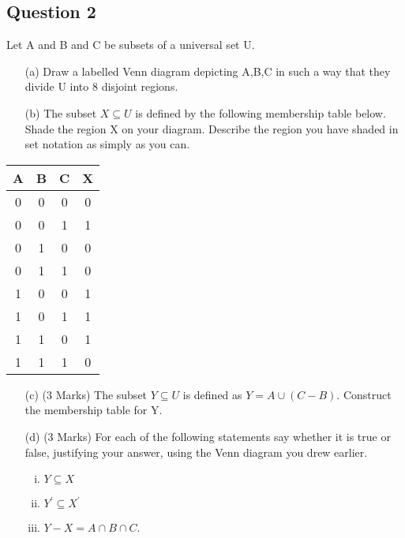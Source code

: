 \documentclass[11pt,a4paper,titlepage,oneside,openany]{article}
\numberwithin{equation}{section}
\numberwithin{algorithm}{section}
\numberwithin{figure}{section}
\numberwithin{table}{section}
\begin{document}
\newpage




\subsection*{Question 2}
Let A and B and C be subsets of a universal set U.
\begin{itemize}
\item[(a)] Draw a labelled Venn diagram depicting A,B,C in such a way that they divide
U into 8 disjoint regions. 
\item[(b)] The subset $X \subseteq U$ is defined by the following membership table below. Shade the region X on your diagram. Describe the region you have shaded in
set notation as simply as you can. 
\end{itemize}
{\LARGE
\begin{center}
\begin{tabular}{|c|c|c|c|}
\hline
A & B & C & X \\ \hline
0 & 0 & 0 & 0 \\ \hline
0 & 0 & 1 & 1 \\ \hline
0 & 1 & 0 & 0 \\ \hline
0 & 1 & 1 & 0 \\ \hline
1 & 0 & 0 & 1 \\ \hline
1 & 0 & 1 & 1 \\ \hline
1 & 1 & 0 & 1 \\ \hline
1 & 1 & 1 & 0 \\ \hline
\end{tabular} 
\end{center}
}
\begin{itemize}
\item[(c)] (3 Marks) The subset $Y \subseteq U$ is defined as $Y = A \cup (C - B)$. Construct the membership
table for Y. 
\item[(d)] (3 Marks) For each of the following statements say whether it is true or false, justifying
your answer, using the Venn diagram you drew earlier.

\begin{enumerate}[(i)]
\item $Y \subseteq X$
\item $Y^{\prime} \subseteq X^{\prime}$
\item $Y - X = A \cap B \cap C$.
\end{enumerate}
\end{itemize}
\end{document}
